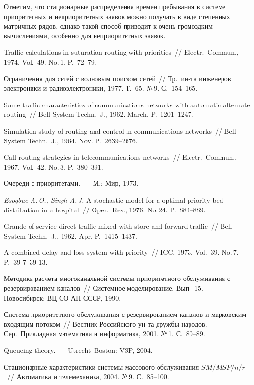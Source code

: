 \begin{multicols}{2}
Отметим, что стационарные распределения времен пребывания в системе
приоритетных и неприоритетных заявок можно получать в виде
степенных матричных рядов, однако такой способ приводит к очень
громоздким вычислениями, особенно для неприоритетных заявок.

{\small\frenchspacing
{%
\begin{thebibliography}{99}

 Traffic calculations in suturation routing
with priorities~// Electr.\ Commun., 1974. Vol.~49. No.\,1. P.~72--79.

 Ограничения для сетей с волновым поиском
сетей~// Тр.\ ин-та инженеров электроники и радиоэлектроники, 1977.
Т.~65. №\,9. С.~154--165.

Some traffic characteristics of communications networks with
automatic alternate routing~//
Bell System Techn.\ J., 1962. March. P.~1201--1247.

Simulation study of routing and control in communications networks~//
Bell System Techn.\ J., 1964. Nov. P.~2639--2676.

 Call routing strategies in telecommunications
networks~// Electr.\ Commun., 1967. Vol.~42. No.\,3. P.~380--391.

Очереди с приоритетами.~--- М.: Мир, 1973.

{\it Esoqbue A.\,O., Singh A.\,J.} A stochastic model for a optimal
priority bed distribution in a hospital~// Oper.\ Res., 1976. No.\,24. P.~884--889.

Grande of service direct traffic mixed with store-and-forward traffic~//
Bell System Techn.\ J., 1962. Apr. P.~1415--1437.

 A combined delay and loss system with priority~//
ICC, 1973. Vol.~39. No.\,7. P.~39-7--39-13.

Методика расчета многоканальной системы приоритетного обслуживания
с резервированием каналов~//
Системное моделирование. Вып.~15.~--- Новосибирск: ВЦ СО АН СССР, 1990.

Система приоритетного обслуживания с резервированием каналов
и марковским входящим потоком~//
Вестник Российского ун-та дружбы народов.
Сер.\ Прикладная математика и информатика, 2001. №\,1. С.~80--89.

Queueing theory.~--- Utrecht--Boston: VSP, 2004.

\label{end\stat}

Стационарные характеристики системы массового обслуживания
$SM/MSP/n/r$~// Автоматика и телемеханика, 2004. №\,9. С.~85--100.

 \end{thebibliography}
}
}


\end{multicols}  